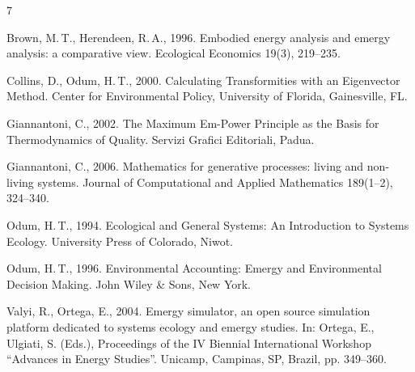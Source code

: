 \documentclass[3p,times,authoryear]{elsarticle}
\begin{document}
\begin{thebibliography}{7}

Brown, M.\,T., Herendeen, R.\,A., 1996. Embodied energy analysis and emergy analysis: a comparative view. Ecological Economics 19(3), 219--235.

Collins, D., Odum, H.\,T., 2000. Calculating Transformities with an Eigenvector Method. Center for Environmental Policy, University of Florida, Gainesville, FL.

Giannantoni, C., 2002. The Maximum Em-Power Principle as the Basis for Thermodynamics of Quality. Servizi Grafici Editoriali, Padua.

Giannantoni, C., 2006. Mathematics for generative processes: living and non-living systems. Journal of Computational and Applied Mathematics 189(1--2), 324--340.

Odum, H.\,T., 1994. Ecological and General Systems: An Introduction to Systems Ecology. University Press of Colorado, Niwot.

Odum, H.\,T., 1996. Environmental Accounting: Emergy and Environmental Decision Making. John Wiley \& Sons, New York.

Valyi, R., Ortega, E., 2004. Emergy simulator, an open source simulation platform dedicated to systems ecology and emergy studies. In: Ortega, E., Ulgiati, S. (Eds.), Proceedings of the IV Biennial International Workshop ``Advances in Energy Studies''. Unicamp, Campinas, SP, Brazil, pp. 349--360.

\end{thebibliography}
\end{document}
